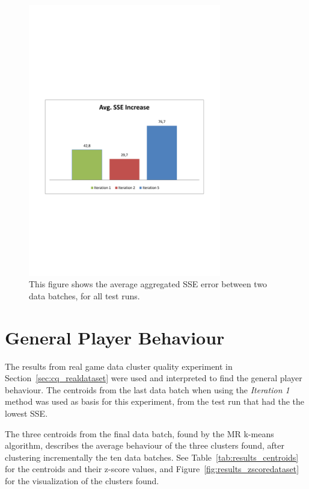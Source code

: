 \begin{figure}[ht]
\centering
\includegraphics[trim = 10mm 90mm 10mm 100mm, clip, width=0.75\textwidth]{Figures/experiments/gen_AvgSSEIncrease.pdf}
\caption{This figure shows the average aggregated SSE error between two data batches, for all test runs. }
\label{fig:results_gen_AvgSSEIncrease}
\end{figure}

\newpage
\section{General Player Behaviour}
The results from real game data cluster quality experiment in Section~\ref{sec:cq_realdataset} were used and interpreted to find the general player behaviour. The centroids from the last data batch when using the \textit{Iteration 1} method was used as basis for this experiment, from the test run that had the the lowest SSE. 

The three centroids from the final data batch, found by the MR k-means algorithm, describes the average behaviour of the three clusters found, after clustering incrementally the ten data batches. See Table~\ref{tab:results_centroids} for the centroids and their z-score values, and Figure~\ref{fig:results_zscoredataset} for the visualization of the clusters found.

